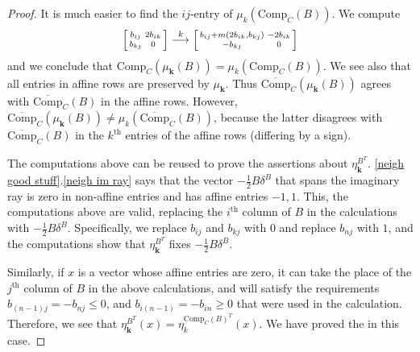 \documentclass{amsart}
\theoremstyle{definition}
\theoremstyle{remark}
\numberwithin{equation}{section}
\newcommand{\set}[1]{{\lbrace #1 \rbrace}}
\renewcommand{\th}{^\text{th}}
\newcommand{\0}{{\mathbf{0}}}
\newcommand{\Comp}{\mathrm{Comp}_C}
\newcommand{\CompPlus}{\overline{\mathrm{Comp}}_C}
\newcommand{\kk}{\mathbf{k}}
\renewcommand{\th}{^\text{th}}
\begin{document}
\begin{proof}
It is much easier to find the $ij$-entry of $\mu_k(\Comp(B))$.
We compute
\[
\begin{bsmallmatrix*}
b_{ij}&2b_{ik}\\
b_{kj}&0
\end{bsmallmatrix*}
\overset{k}{\longrightarrow}
\begin{bsmallmatrix*}
b_{ij}+m(2b_{ik},b_{kj})&-2b_{ik}\\
-b_{kj}&0
\end{bsmallmatrix*}
\]
and we conclude that $\Comp(\mu_\kk(B))=\mu_k(\Comp(B))$.
We see also that all entries in affine rows are preserved by $\mu_\kk$.
Thus $\CompPlus(\mu_\kk(B))$ agrees with $\CompPlus(B)$ in the affine rows.
However, $\CompPlus(\mu_\kk(B))\neq\mu_k(\CompPlus(B))$, because the latter disagrees with $\CompPlus(B)$ in the $k\th$ entries of the affine rows (differing by a sign).

The computations above can be reused to prove the assertions about $\eta^{B^T}_\kk$.
\cref{neigh good stuff}.\ref{neigh im ray} says that the vector $-\frac12B\delta^B$ that spans the imaginary ray is zero in non-affine entries and has affine entries $-1,1$.
This, the computations above are valid, replacing the $i\th$ column of $B$ in the calculations with $-\frac12B\delta^B$.
Specifically, we replace $b_{ij}$ and $b_{kj}$ with $0$ and replace $b_{nj}$ with $1$, and the computations show that $\eta^{B^T}_\kk$ fixes $-\frac12B\delta^B$.

Similarly, if $x$ is a vector whose affine entries are zero, it can take the place of the $j\th$ column of $B$ in the above calculations, and will satisfy the requirements $b_{(n-1)j}=-b_{nj}\le0$, and $b_{i(n-1)}=-b_{in}\ge0$ that were used in the calculation.  
Therefore, we see that $\eta^{B^T}_\kk(x)=\eta^{\Comp(B)^T}_k(x)$.
We have proved the  in this case.


\end{proof}
\end{document}

